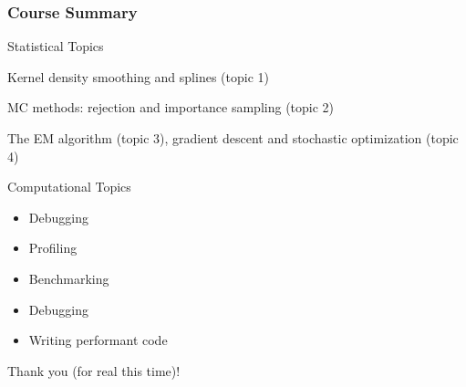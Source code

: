 \documentclass[aspectratio=1610,onlytextwidth]{beamer}
\begin{document}
\begin{frame}[c]
  \frametitle{Course Summary}

  \begin{block}{Statistical Topics}
    \begin{description}[<+->][Optimization]
      \item[Smoothing] Kernel density smoothing and splines (topic 1)
      \item[Simulation] MC methods: rejection and importance sampling (topic 2)
      \item[Optimization] The EM algorithm (topic 3), gradient descent and stochastic optimization (topic 4)
    \end{description}
  \end{block}

  \pause

  \begin{block}{Computational Topics}
    \begin{itemize}
      \item Debugging
      \item Profiling
      \item Benchmarking
      \item Debugging
      \item Writing performant code
    \end{itemize}
  \end{block}
\end{frame}

\begin{frame}[standout]
  Thank you (for real this time)!
\end{frame}


\end{document}
